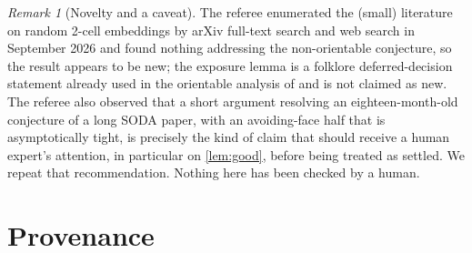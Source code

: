 \documentclass[11pt,a4paper]{article}
\theoremstyle{plain}
\theoremstyle{definition}
\theoremstyle{remark}
\newtheorem{remark}[theorem]{Remark}
\begin{document}
\begin{remark}[Novelty and a caveat]\label{rem:novelty}
The referee enumerated the (small) literature on random 2-cell embeddings by arXiv full-text search and web search in September 2026 and found nothing addressing the non-orientable conjecture, so the result appears to be new; the exposure lemma is a folklore deferred-decision statement already used in the orientable analysis of \cite{CHMMS} and is not claimed as new. The referee also observed that a short argument resolving an eighteen-month-old conjecture of a long SODA paper, with an avoiding-face half that is asymptotically tight, is precisely the kind of claim that should receive a human expert's attention, in particular on \cref{lem:good}, before being treated as settled. We repeat that recommendation. Nothing here has been checked by a human.
\end{remark}

\section{Provenance}\label{sec:provenance}
\end{document}
